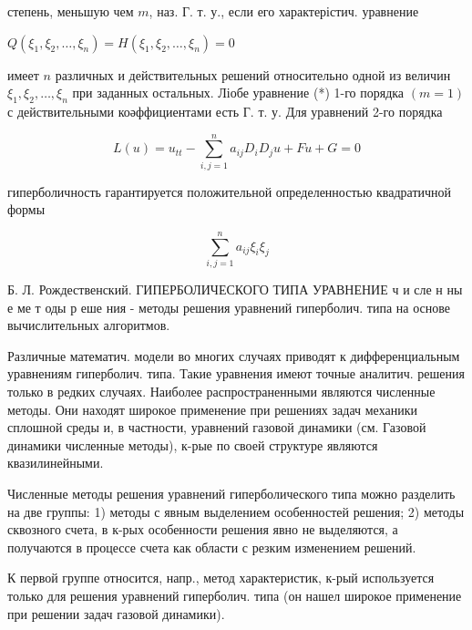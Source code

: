 \documentclass[10pt]{article}
\begin{document}
степень, меньшую чем $m$, наз. Г. т. у., если его характерістич. уравнение



$Q\left(\xi_{1}, \xi_{2}, \ldots, \xi_{n}\right)=H\left(\xi_{1}, \xi_{2}, \ldots, \xi_{n}\right)=0$



имеет $n$ различных и действительных решений относительно одной из величин $\xi_{1}, \xi_{2}, \ldots, \xi_{n}$ при заданных остальных. Ліобе уравнение (*) 1-го порядка $(m=1)$ с действительными коәффициентами есть Г. т. у. Для уравнений 2-го порядка



\[

L(u)=u_{t t}-\sum_{i, j=1}^{n} a_{i j} D_{i} D_{j} u+F u+G=0

\]



гиперболичность гарантируется положительной определенностью квадратичной формы



\[

\sum_{i, j=1}^{n} a_{i j} \xi_{i} \xi_{j}

\]



Б. Л. Рождественский. ГИПЕРБОЛИЧЕСКОГО ТИПА УРАВНЕНИЕ ч и сле н ны е ме т оды р еше ния - методы решения уравнений гиперболич. типа на основе вычислительных алгоритмов.



Различные математич. модели во многих случаях приводят к дифференциальным уравнениям гиперболич. типа. Такие уравнения имеют точные аналитич. решения только в редких случаях. Наиболее распространенными являются численные методы. Они находят широкое применение при решениях задач механики сплошной среды и, в частности, уравнений газовой динамики (см. Газовой динамики численные методы), к-рые по своей структуре являются квазилинейными.



Численные методы решения уравнений гиперболического типа можно разделить на две группы: 1) методы с явным выделением особенностей решения; 2) методы сквозного счета, в к-рых особенности решения явно не выделяются, а получаются в процессе счета как области с резким изменением решений.



К первой группе относится, напр., метод характеристик, к-рый используется только для решения уравнений гиперболич. типа (он нашел широкое применение при решении задач газовой динамики).
\end{document}
